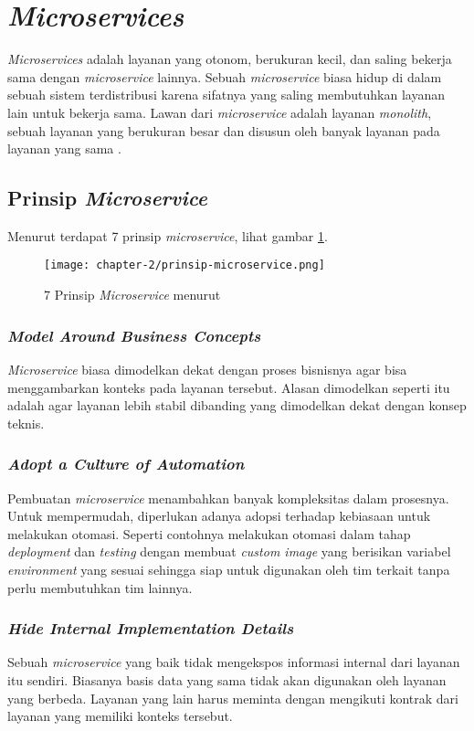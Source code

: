 \section{\emph{Microservices}}
\emph{Microservices} adalah layanan yang otonom, berukuran kecil, dan saling bekerja sama dengan \emph{microservice} lainnya. Sebuah \emph{microservice} biasa hidup di dalam sebuah sistem terdistribusi karena sifatnya yang saling membutuhkan layanan lain untuk bekerja sama. Lawan dari \emph{microservice} adalah layanan \emph{monolith}, sebuah layanan yang berukuran besar dan disusun oleh banyak layanan pada layanan yang sama \parencite{microservice}.

\subsection{Prinsip \emph{Microservice}}
Menurut \parencite{microservice} terdapat 7 prinsip \emph{microservice}, lihat gambar \ref{fig:prinsip-microservice}.

\begin{figure}[h]
    \centering
    \texttt{[image: chapter-2/prinsip-microservice.png]}
    \caption{7 Prinsip \emph{Microservice} menurut \parencite{microservice}}
    \label{fig:prinsip-microservice}
\end{figure}

\subsubsection{\emph{Model Around Business Concepts}}
\emph{Microservice} biasa dimodelkan dekat dengan proses bisnisnya agar bisa menggambarkan konteks pada layanan tersebut. Alasan dimodelkan seperti itu adalah agar layanan lebih stabil dibanding yang dimodelkan dekat dengan konsep teknis.

\subsubsection{\emph{Adopt a Culture of Automation}}
Pembuatan \emph{microservice} menambahkan banyak kompleksitas dalam prosesnya. Untuk mempermudah, diperlukan adanya adopsi terhadap kebiasaan untuk melakukan otomasi. Seperti contohnya melakukan otomasi dalam tahap \emph{deployment} dan \emph{testing} dengan membuat \emph{custom image} yang berisikan variabel \emph{environment} yang sesuai sehingga siap untuk digunakan oleh tim terkait tanpa perlu membutuhkan tim lainnya. 

\subsubsection{\emph{Hide Internal Implementation Details}}
Sebuah \emph{microservice} yang baik tidak mengekspos informasi internal dari layanan itu sendiri. Biasanya basis data yang sama tidak akan digunakan oleh layanan yang berbeda. Layanan yang lain harus meminta dengan mengikuti kontrak dari layanan yang memiliki konteks tersebut.

